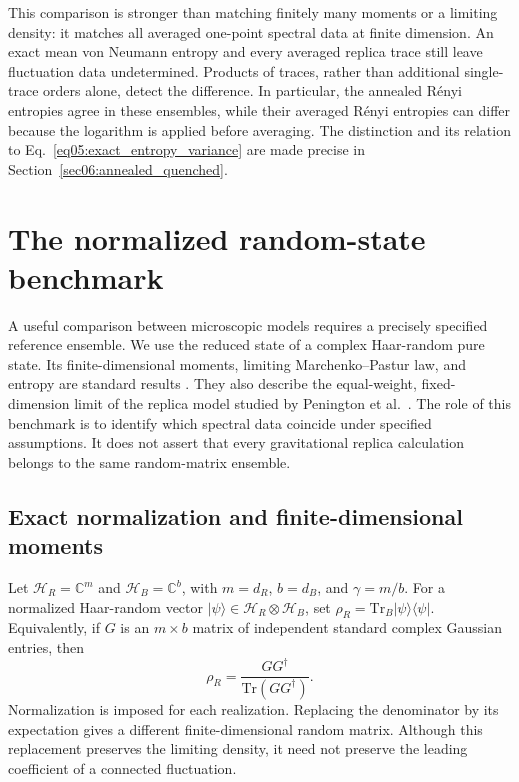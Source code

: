 \documentclass[11pt,letterpaper]{article}
\theoremstyle{plain}
\theoremstyle{definition}
\theoremstyle{remark}
\begin{document}
This comparison is stronger than matching finitely many moments or a
limiting density: it matches all averaged one-point spectral data at
finite dimension.  An exact mean von Neumann entropy and every averaged
replica trace still leave fluctuation data undetermined.  Products of
traces, rather than additional single-trace orders alone, detect the
difference.  In particular, the annealed R\'enyi entropies agree in
these ensembles, while their averaged R\'enyi entropies can differ
because the logarithm is applied before averaging.  The distinction
and its relation to Eq.~\eqref{eq05:exact_entropy_variance} are made
precise in Section~\ref{sec06:annealed_quenched}.


\section{The normalized random-state benchmark}
\label{sec03:paper_one_universality}

A useful comparison between microscopic models requires a precisely
specified reference ensemble.  We use the reduced state of a complex
Haar-random pure state.  Its finite-dimensional moments, limiting
Marchenko--Pastur law, and entropy are standard results
\cite{lubkin1978,lloydpagels1988,page1993,sen1996,nicaspeicher2006}.
They also describe the equal-weight, fixed-dimension limit of the
replica model studied by Penington et al.~\cite{pssyetal2022}.
The role of this benchmark is to identify which spectral data coincide
under specified assumptions.  It does not assert that every gravitational
replica calculation belongs to the same random-matrix ensemble.

\subsection{Exact normalization and finite-dimensional moments}
\label{subsec03:non_crossing_sum}

Let $\mathcal H_R=\mathbb C^m$ and $\mathcal H_B=\mathbb C^b$, with
$m=d_R$, $b=d_B$, and $\gamma=m/b$.  For a normalized Haar-random vector
$|\psi\rangle\in\mathcal H_R\otimes\mathcal H_B$, set
$\rho_R=\mathrm{Tr}_B|\psi\rangle\langle\psi|$.  Equivalently, if
$G$ is an $m\times b$ matrix of independent standard complex Gaussian
entries, then
\begin{equation}
\label{eq03:normalized_wishart}
 \rho_R=\frac{GG^\dagger}{\mathrm{Tr}(GG^\dagger)}.
\end{equation}
Normalization is imposed for each realization.  Replacing the denominator
by its expectation gives a different finite-dimensional random matrix.
Although this replacement preserves the limiting density, it need not
preserve the leading coefficient of a connected fluctuation.
\end{document}
